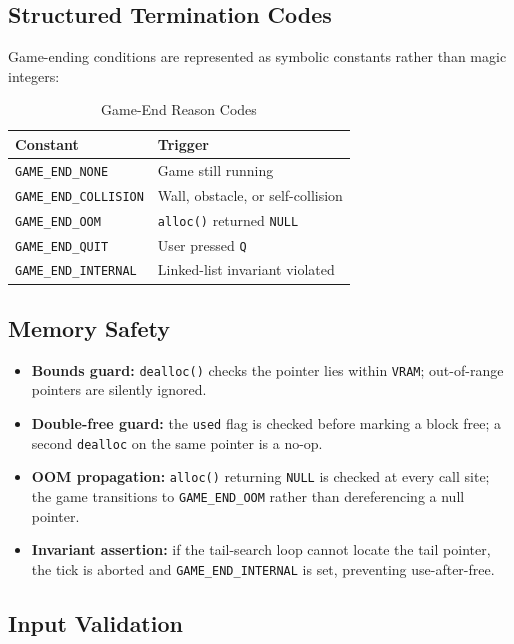 \documentclass[conference]{IEEEtran}
\begin{document}
\subsection{Structured Termination Codes}

Game-ending conditions are represented as symbolic constants rather than
magic integers:

\begin{table}[h]
\centering
\caption{Game-End Reason Codes}
\begin{tabular}{ll}
\toprule
\textbf{Constant} & \textbf{Trigger} \\
\midrule
\texttt{GAME\_END\_NONE}      & Game still running \\
\texttt{GAME\_END\_COLLISION} & Wall, obstacle, or self-collision \\
\texttt{GAME\_END\_OOM}       & \texttt{alloc()} returned \texttt{NULL} \\
\texttt{GAME\_END\_QUIT}      & User pressed \texttt{Q} \\
\texttt{GAME\_END\_INTERNAL}  & Linked-list invariant violated \\
\bottomrule
\end{tabular}
\end{table}

\subsection{Memory Safety}

\begin{itemize}
  \item \textbf{Bounds guard:} \texttt{dealloc()} checks the pointer lies
        within \texttt{VRAM}; out-of-range pointers are silently ignored.
  \item \textbf{Double-free guard:} the \texttt{used} flag is checked before
        marking a block free; a second \texttt{dealloc} on the same pointer is
        a no-op.
  \item \textbf{OOM propagation:} \texttt{alloc()} returning \texttt{NULL} is
        checked at every call site; the game transitions to
        \texttt{GAME\_END\_OOM} rather than dereferencing a null pointer.
  \item \textbf{Invariant assertion:} if the tail-search loop cannot locate
        the tail pointer, the tick is aborted and \texttt{GAME\_END\_INTERNAL}
        is set, preventing use-after-free.
\end{itemize}

\subsection{Input Validation}
\end{document}

